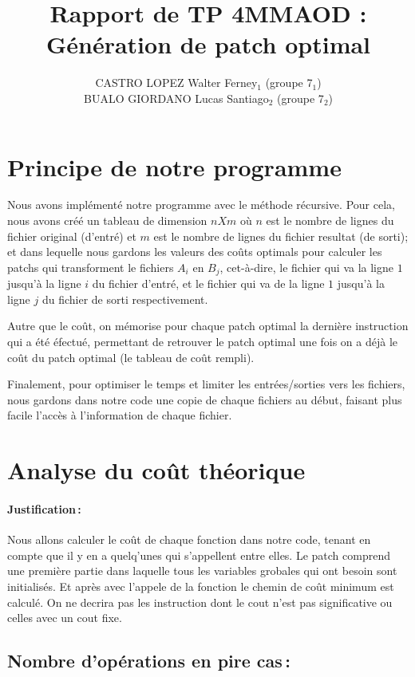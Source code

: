 \documentclass[a4paper, 10pt, french]{article}
\title{Rapport de TP 4MMAOD : Génération de patch optimal}
\author{
CASTRO LOPEZ Walter Ferney$_1$ (groupe 7$_1$) 
\\ BUALO GIORDANO Lucas Santiago$_2$ (groupe 7$_2$) 
}
\begin{document}
\maketitle
\section{Principe de notre  programme}
Nous avons implémenté notre programme avec le méthode récursive. Pour cela, nous avons créé un tableau de dimension $n X m$ où $n$ est le nombre de lignes du fichier original (d'entré) et $m$ est le nombre de lignes du fichier resultat (de sorti); et dans lequelle nous gardons les valeurs des coûts optimals pour calculer les patchs qui transforment le fichiers $A_i$ en $B_j$, cet-à-dire, le fichier qui va la ligne $1$ jusqu'à la ligne $i$ du fichier d'entré, et le fichier qui va de la ligne $1$ jusqu'à la ligne $j$ du fichier de sorti respectivement.

Autre que le coût, on mémorise pour chaque patch optimal la dernière instruction qui a été éfectué, permettant de retrouver le patch optimal une fois on a déjà le coût du patch optimal (le tableau de coût rempli).

Finalement, pour optimiser le temps et limiter les entrées/sorties vers les fichiers, nous gardons dans notre code une copie de chaque fichiers au début, faisant plus facile l'accès à l'information de chaque fichier.

\section{Analyse du coût théorique}
    \paragraph{Justification\,: }
Nous allons calculer le coût de chaque fonction dans notre code, tenant en compte que il y en a quelq'unes qui s'appellent entre elles. Le patch comprend une première partie dans laquelle tous les variables grobales qui ont besoin sont initialisés. Et après avec l'appele de la fonction le chemin de coût minimum est calculé. On ne decrira pas les instruction dont le cout n'est pas significative ou celles avec un cout fixe.

  \subsection{Nombre  d'opérations en pire cas\,: }
\end{document}
